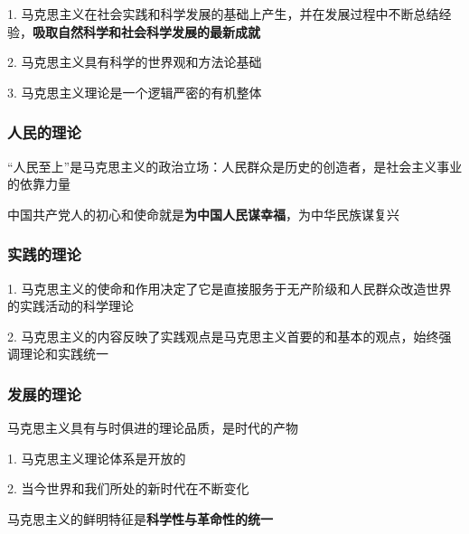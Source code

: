 1. 马克思主义在社会实践和科学发展的基础上产生，并在发展过程中不断总结经验，\textbf{吸取自然科学和社会科学发展的最新成就}

2. 马克思主义具有科学的世界观和方法论基础

3. 马克思主义理论是一个逻辑严密的有机整体

\subsubsection{人民的理论}%
\label{subsub:人民的理论}
“人民至上”是马克思主义的政治立场：人民群众是历史的创造者，是社会主义事业的依靠力量
\begin{notation}
    中国共产党人的初心和使命就是\textbf{为中国人民谋幸福}，为中华民族谋复兴
\end{notation}
\subsubsection{实践的理论}%
\label{subsub:实践的理论}
1. 马克思主义的使命和作用决定了它是直接服务于无产阶级和人民群众改造世界的实践活动的科学理论

2. 马克思主义的内容反映了实践观点是马克思主义首要的和基本的观点，始终强调理论和实践统一
\subsubsection{发展的理论}%
\label{subsub:发展的理论}
马克思主义具有与时俱进的理论品质，是时代的产物

1. 马克思主义理论体系是开放的

2. 当今世界和我们所处的新时代在不断变化
\begin{notation}
    马克思主义的鲜明特征是\textbf{科学性与革命性的统一}
\end{notation}




